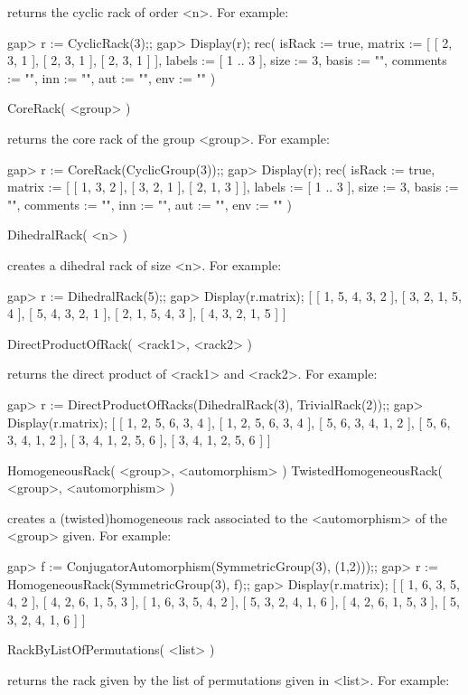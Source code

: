 returns the cyclic rack of order <n>. For example:

\beginexample
gap> r := CyclicRack(3);;
gap> Display(r);
rec(
  isRack := true,
  matrix := [ [ 2, 3, 1 ], [ 2, 3, 1 ], [ 2, 3, 1 ] ],
  labels := [ 1 .. 3 ],
  size := 3,
  basis := "",
  comments := "",
  inn := "",
  aut := "",
  env := "" )
\endexample

\>CoreRack( <group> )

returns the core rack of the group <group>. For example:

\beginexample
gap> r := CoreRack(CyclicGroup(3));;
gap> Display(r);
rec(
  isRack := true,
  matrix := [ [ 1, 3, 2 ], [ 3, 2, 1 ], [ 2, 1, 3 ] ],
  labels := [ 1 .. 3 ],
  size := 3,
  basis := "",
  comments := "",
  inn := "",
  aut := "",
  env := "" )
\endexample

\>DihedralRack( <n> ) 

creates a dihedral rack of size <n>. For example:

\beginexample
gap> r := DihedralRack(5);;
gap> Display(r.matrix);
[ [  1,  5,  4,  3,  2 ],
  [  3,  2,  1,  5,  4 ],
  [  5,  4,  3,  2,  1 ],
  [  2,  1,  5,  4,  3 ],
  [  4,  3,  2,  1,  5 ] ]
\endexample

\>DirectProductOfRack( <rack1>, <rack2> )

returns the direct product of <rack1> and <rack2>.
For example:

\beginexample
gap> r := DirectProductOfRacks(DihedralRack(3), TrivialRack(2));;
gap> Display(r.matrix);
[ [  1,  2,  5,  6,  3,  4 ],
  [  1,  2,  5,  6,  3,  4 ],
  [  5,  6,  3,  4,  1,  2 ],
  [  5,  6,  3,  4,  1,  2 ],
  [  3,  4,  1,  2,  5,  6 ],
  [  3,  4,  1,  2,  5,  6 ] ]
\endexample

\>HomogeneousRack( <group>, <automorphism> )
\>TwistedHomogeneousRack( <group>, <automorphism> )

creates a (twisted)homogeneous rack associated to the <automorphism> 
of the <group> given. For example:

\beginexample
gap> f := ConjugatorAutomorphism(SymmetricGroup(3), (1,2)));;
gap> r := HomogeneousRack(SymmetricGroup(3), f);;
gap> Display(r.matrix);
[ [  1,  6,  3,  5,  4,  2 ],
  [  4,  2,  6,  1,  5,  3 ],
  [  1,  6,  3,  5,  4,  2 ],
  [  5,  3,  2,  4,  1,  6 ],
  [  4,  2,  6,  1,  5,  3 ],
  [  5,  3,  2,  4,  1,  6 ] ]
\endexample

\>RackByListOfPermutations( <list> )

returns the rack given by the list of permutations given in <list>. For example:

